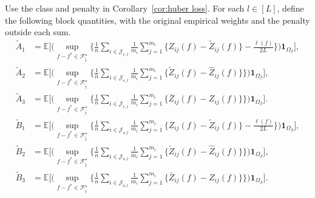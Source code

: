 \documentclass[twoside,11pt]{article}
\newenvironment{revision}{\color{revisionred}}{}
\begin{document}
\begin{revision}
\begin{theorem}
\label{theorem7}
Use the class and penalty in Corollary~\ref{cor:huber loss}.
For each $l\in[L]$, define the following block quantities, with
the original empirical weights and the penalty outside each sum.
\begin{equation}
\label{tilde_A}
\begin{aligned}
\tilde A_1&=\mathbb E\Biggl[\Biggl(
\sup_{f-f^*\in\mathcal F_{\tilde t}^{\star}}
\biggl\{\frac1n\sum_{i\in\mathcal J_{e,l}}\frac1{m_i}
\sum_{j=1}^{m_i}\bigl\{Z_{ij}(f)-\tilde Z_{ij}(f)\bigr\}
-\frac{\ell(f)}{2L}
\biggr\}\Biggr)\mathbf1_{\Omega_\beta}\Biggr],\\
\tilde A_2&=\mathbb E\Biggl[\Biggl(
\sup_{f-f^*\in\mathcal F_{\tilde t}^{\star}}
\biggl\{\frac1n\sum_{i\in\mathcal J_{e,l}}\frac1{m_i}
\sum_{j=1}^{m_i}\bigl\{\tilde Z_{ij}(f)-\hat Z_{ij}(f)\bigr\}
\biggr\}\Biggr)\mathbf1_{\Omega_\beta}\Biggr],\\
\tilde A_3&=\mathbb E\Biggl[\Biggl(
\sup_{f-f^*\in\mathcal F_{\tilde t}^{\star}}
\biggl\{\frac1n\sum_{i\in\mathcal J_{e,l}}\frac1{m_i}
\sum_{j=1}^{m_i}\bigl\{\bar Z_{ij}(f)-Z_{ij}(f)\bigr\}
\biggr\}\Biggr)\mathbf1_{\Omega_\beta}\Biggr].
\end{aligned}
\end{equation}
\begin{equation}
\label{tilde_B}
\begin{aligned}
\tilde B_1&=\mathbb E\Biggl[\Biggl(
\sup_{f-f^*\in\mathcal F_{\tilde t}^{\star}}
\biggl\{\frac1n\sum_{i\in\mathcal J_{o,l}}\frac1{m_i}
\sum_{j=1}^{m_i}\bigl\{Z_{ij}(f)-\tilde Z_{ij}(f)\bigr\}
-\frac{\ell(f)}{2L}
\biggr\}\Biggr)\mathbf1_{\Omega_\beta}\Biggr],\\
\tilde B_2&=\mathbb E\Biggl[\Biggl(
\sup_{f-f^*\in\mathcal F_{\tilde t}^{\star}}
\biggl\{\frac1n\sum_{i\in\mathcal J_{o,l}}\frac1{m_i}
\sum_{j=1}^{m_i}\bigl\{\tilde Z_{ij}(f)-\hat Z_{ij}(f)\bigr\}
\biggr\}\Biggr)\mathbf1_{\Omega_\beta}\Biggr],\\
\tilde B_3&=\mathbb E\Biggl[\Biggl(
\sup_{f-f^*\in\mathcal F_{\tilde t}^{\star}}
\biggl\{\frac1n\sum_{i\in\mathcal J_{o,l}}\frac1{m_i}
\sum_{j=1}^{m_i}\bigl\{\bar Z_{ij}(f)-Z_{ij}(f)\bigr\}
\biggr\}\Biggr)\mathbf1_{\Omega_\beta}\Biggr].
\end{aligned}
\end{equation}
\begin{equation}
\label{tilde_E}
\begin{aligned}

\end{aligned}
\end{equation}
\end{theorem}
\end{revision}
\end{document}

